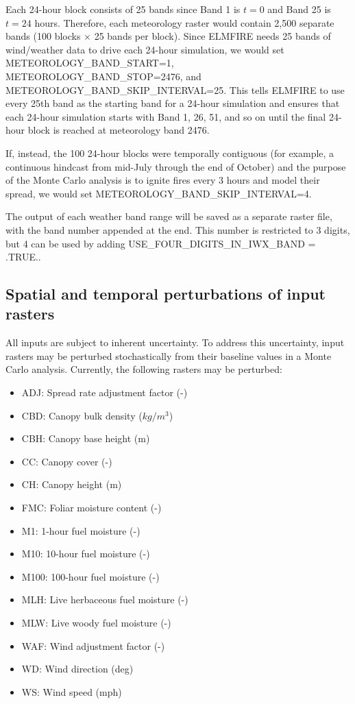 Each 24-hour block consists of 25 bands since Band 1 is $t = 0$ and Band 25 is $t = 24$ hours. Therefore, each meteorology raster would contain 2,500 separate bands (100 blocks $\times$ 25 bands per block). Since ELMFIRE needs 25 bands of wind/weather data to drive each 24-hour simulation, we would set METEOROLOGY\_BAND\_START=1, METEOROLOGY\_BAND\_STOP=2476, and METEOROLOGY\_BAND\_SKIP\_INTERVAL=25. This tells ELMFIRE to use every 25th band as the starting band for a 24-hour simulation and ensures that each 24-hour simulation starts with Band 1, 26, 51, and so on until the final 24-hour block is reached at meteorology band 2476.

If, instead, the 100 24-hour blocks were temporally contiguous (for example, a continuous hindcast from mid-July through the end of October) and the purpose of the Monte Carlo analysis is to ignite fires every 3 hours and model their spread, we would set METEOROLOGY\_BAND\_SKIP\_INTERVAL=4.

The output of each weather band range will be saved as a separate raster file, with the band number appended at the end. This number is restricted to 3 digits, but 4 can be used by adding USE\_FOUR\_DIGITS\_IN\_IWX\_BAND = .TRUE..

\subsection{Spatial and temporal perturbations of input rasters}
\label{spatial_temporal_pertrubations}

All inputs are subject to inherent uncertainty. To address this uncertainty, input rasters may be perturbed stochastically from their baseline values in a Monte Carlo analysis. Currently, the following rasters may be perturbed:

\begin{itemize}
    \item ADJ: Spread rate adjustment factor (-)
    \item CBD: Canopy bulk density ($kg/m^3$)
    \item CBH: Canopy base height (m)
    \item CC: Canopy cover (-)
    \item CH: Canopy height (m)
    \item FMC: Foliar moisture content (-)
    \item M1: 1-hour fuel moisture (-)
    \item M10: 10-hour fuel moisture (-)
    \item M100: 100-hour fuel moisture (-)
    \item MLH: Live herbaceous fuel moisture (-)
    \item MLW: Live woody fuel moisture (-)
    \item WAF: Wind adjustment factor (-)
    \item WD: Wind direction (deg)
    \item WS: Wind speed (mph)
\end{itemize}

